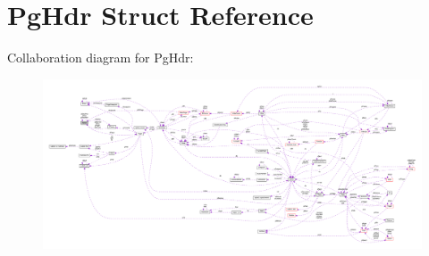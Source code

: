 \hypertarget{struct_pg_hdr}{\section{Pg\-Hdr Struct Reference}
\label{struct_pg_hdr}
}


Collaboration diagram for Pg\-Hdr\-:\nopagebreak
\begin{figure}[H]
\begin{center}
\leavevmode
\includegraphics[width=350pt]{struct_pg_hdr__coll__graph}
\end{center}
\end{figure}
